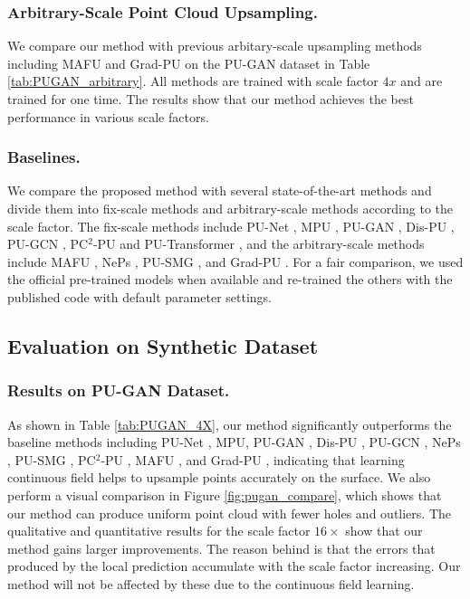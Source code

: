 \documentclass[letterpaper]{article} %
\begin{document}
\subsubsection{Arbitrary-Scale Point Cloud Upsampling.}
We compare our method with previous arbitary-scale upsampling methods including MAFU and Grad-PU on the PU-GAN dataset in Table \ref{tab:PUGAN_arbitrary}. All methods are trained with scale factor $4x$ and are trained for one time. The results show that our method achieves the best performance in various scale factors.
\subsubsection{Baselines.}
We compare the proposed method with several state-of-the-art methods and divide them into fix-scale methods and arbitrary-scale methods according to the scale factor. The fix-scale methods include PU-Net \cite{yu2018pu}, MPU \cite{yifan2019patch}, PU-GAN \cite{li2019pu}, Dis-PU \cite{li2021point}, PU-GCN \cite{qian2021pu}, {PC}$^2$-PU\cite{long2022pc2} and PU-Transformer \cite{qiu2022pu}, and the arbitrary-scale methods include MAFU \cite{qian2021deep}, NePs \cite{feng2022neural}, PU-SMG \cite{dell2022arbitrary}, and Grad-PU \cite{he2023grad}. For a fair comparison, we used the official pre-trained models when available and re-trained the others with the published code with default parameter settings.


\subsection{Evaluation on Synthetic Dataset}
\subsubsection{Results on PU-GAN Dataset.}
As shown in Table \ref{tab:PUGAN_4X}, our method significantly outperforms the baseline methods including PU-Net \cite{yu2018pu}, MPU\cite{yifan2019patch}, PU-GAN \cite{li2019pu}, Dis-PU \cite{li2021point}, PU-GCN \cite{qian2021pu}, NePs \cite{feng2022neural}, PU-SMG \cite{dell2022arbitrary}, PC$^2$-PU \cite{long2022pc2}, MAFU \cite{qian2021deep}, and Grad-PU \cite{he2023grad}, indicating that learning continuous field helps to upsample points accurately on the surface. We also perform a visual comparison in Figure \ref{fig:pugan_compare}, which shows that our method can produce uniform point cloud with fewer holes and outliers. The qualitative and quantitative results for the scale factor $16\times$ show that our method gains larger improvements. The reason behind is that the errors that produced by the local prediction accumulate with the scale factor increasing. Our method will not be affected by these due to the continuous field learning.
\end{document}
